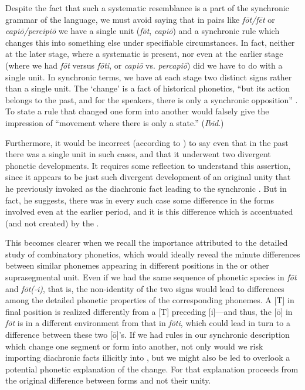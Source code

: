 Despite the fact that such a systematic resemblance is a part of the
synchronic grammar of the language, we must avoid saying that in pairs
like \emph{fōt/fēt} or \emph{capiō/percipiō} we have a single unit
(\emph{fōt}, \emph{capiō}) and a synchronic rule which changes this
into something else under specifiable circumstances. In fact, neither
at the later stage, where a systematic  is present, nor
even at the earlier stage (where we had \emph{fōt} versus \emph{fōti},
or \emph{capiō} vs. \emph{percapiō}) did we have to do with a single
unit. In synchronic terms, we have at each stage two distinct signs
rather than a single unit. The `change' is a fact of historical
phonetics, ``but its action belongs to the past, and for the speakers,
there is only a synchronic opposition''
\citep[219]{saussure16:cours-original}. To state a rule that changed
one form into another would falsely give the impression of ``movement
where there is only a state.'' (\emph{Ibid}.)

Furthermore, it would be incorrect (according to {\Saussure}) to say even
that in the past there was a single unit in such cases, and that it
underwent two divergent phonetic developments. It requires some
reflection to understand this assertion, since it appears to be just
such divergent development of an original unity that he previously
invoked as the diachronic fact leading to the synchronic
. But in fact, he suggests, there was in every such case
some difference in the forms involved even at the earlier period, and
it is this difference which is accentuated (and not created) by the
.

This becomes clearer when we recall the importance {\Saussure} attributed
to the detailed study of combinatory phonetics, which would ideally
reveal the minute differences between similar phonemes appearing in
different positions in the  or other suprasegmental unit. Even
if we had the same sequence of phonetic species in \emph{fōt} and
\emph{fōt(-i)}, that is, the non-identity of the two signs would lead
to differences among the detailed phonetic properties of the
corresponding phonemes. A [T] in final position is realized
differently from a [T] preceding [i]—and thus, the [ō] in \emph{fōt}
is in a different environment from that in \emph{fōti}, which could
lead in turn to a difference between these two [ō]'s. If we had rules
in our synchronic description which change one segment or form into
another, not only would we risk importing diachronic facts illicitly
into , but we might also be led to overlook a potential
phonetic {explanation} of the change. For {\Saussure} that {explanation}
proceeds from the original difference between forms and not their
unity.

